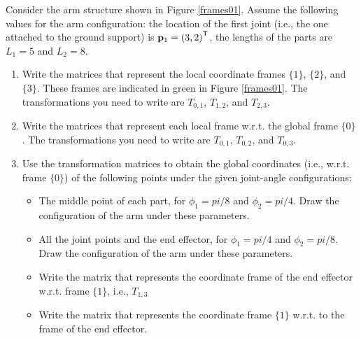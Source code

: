 \documentclass[12pt,letter]{article}
\begin{document}
Consider the arm structure shown in Figure \ref{frames01}. Assume the following values for the arm configuration: the location of the first joint (i.e., the one attached to the ground support) is ${\bf p}_1 = \left(3,2\right)^\mathsf{T}$, the lengths of the parts are $L_1 = 5$ and  $L_2 = 8$.
\begin{enumerate}
	\item  Write the matrices that represent the local coordinate frames $\{1\}$, $\{2\}$, and $\{3\}$. These frames are indicated in green in Figure \ref{frames01}. The transformations you need to write are $T_{0,1}$, $T_{1,2}$, and $T_{2,3}$.
	\item Write the matrices that represent each local frame w.r.t. the global frame $\{0\}$. The transformations you need to write are $T_{0,1}$, $T_{0,2}$, and $T_{0,3}$.
	\item Use the transformation matrices to obtain the global coordinates (i.e., w.r.t. frame $\{0\}$) of the following points under the given joint-angle configurations: 
	\begin{itemize}
		\item The middle point of each part, for $\phi_1 = pi/8$ and $\phi_2 = pi/4$. Draw the configuration of the arm under these parameters. 
		\item All the joint points and the end effector, for $\phi_1 = pi/4$ and $\phi_2 = pi/8$. Draw the configuration of the arm under these parameters. 
		\item Write the matrix that represents the coordinate frame of the end effector w.r.t. frame  $\{1\}$, i.e., $T_{1,3}$
		\item Write the matrix that represents the coordinate frame $\{1\}$ w.r.t. to the frame of the end effector.
	\end{itemize}
\end{enumerate}
\end{document}
